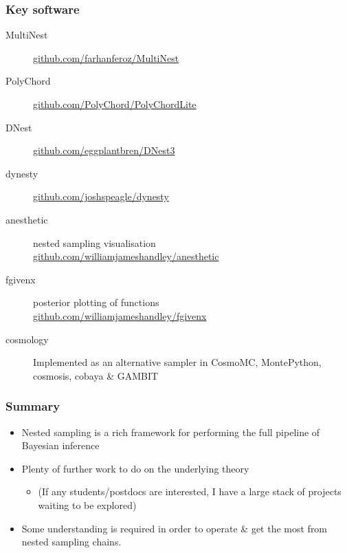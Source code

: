\documentclass[%
]{beamer}
\begin{document}

\begin{frame}
    \frametitle{Key software}
    \begin{description}
        \item[MultiNest] \url{github.com/farhanferoz/MultiNest}
        \item[PolyChord] \url{github.com/PolyChord/PolyChordLite}
        \item[DNest] \url{github.com/eggplantbren/DNest3}
        \item[dynesty] \url{github.com/joshspeagle/dynesty}
        \item[anesthetic] nested sampling visualisation \\ \url{github.com/williamjameshandley/anesthetic}
        \item[fgivenx] posterior plotting of functions \\ \url{github.com/williamjameshandley/fgivenx}
        \item[cosmology] Implemented as an alternative sampler in CosmoMC, MontePython, cosmosis, cobaya \& GAMBIT
    \end{description}
\end{frame}

\begin{frame}
    \frametitle{Summary}
    \begin{itemize}
        \item Nested sampling is a rich framework for performing the full pipeline of Bayesian inference
        \item Plenty of further work to do on the underlying theory
            \begin{itemize}
                \item (If any students/postdocs are interested, I have a large stack of projects waiting to be explored)
            \end{itemize}
        \item Some understanding is required in order to operate \& get the most from nested sampling chains.
    \end{itemize}
\end{frame}


\end{document}
